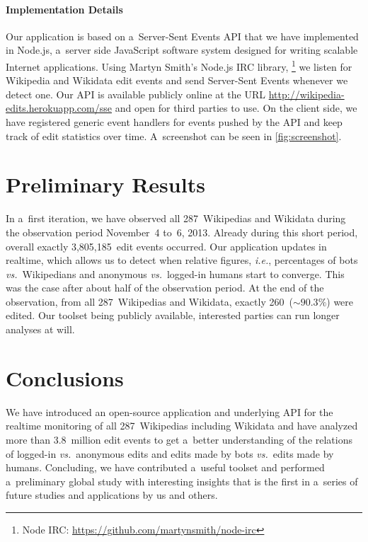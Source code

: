 \documentclass{sig-alternate}
\newcommand{\inlinelistingsize}{\fontsize{8pt}{11pt}}
\let\oldurl\url
\renewcommand{\url}[1]{\inlinelistingsize\oldurl{#1}}
\begin{document}
\paragraph{Implementation Details}

Our application is based on a~Server-Sent Events API
that we have implemented in Node.js,
a~server side JavaScript software system
designed for writing scalable Internet applications.
Using Martyn Smith's Node.js IRC library,%
\footnote{Node IRC:
\url{https://github.com/martynsmith/node-irc}}
we listen for Wikipedia and Wikidata edit events
and send Server-Sent Events whenever we detect one.
Our API is available publicly online
at the URL \url{http://wikipedia-edits.herokuapp.com/sse}
and open for third parties to use.
On the client side, we have registered generic event handlers for events
pushed by the API and keep track of edit statistics over time.
A~screenshot can be seen in \autoref{fig:screenshot}.

\section{Preliminary Results}

In a~first iteration, we have observed all 287~Wikipedias and Wikidata
during the observation period November~4
to~6, 2013.
Already during this short period,
overall exactly 3,805,185~edit events occurred.
Our application updates in realtime,
which allows us to detect when relative figures,
\emph{i.e.}, percentages of bots \emph{vs.}\ Wikipedians
and anonymous \emph{vs.}\ logged-in humans start to converge.
This was the case after about half of the observation period.
At the end of the observation,
from all 287~Wikipedias and Wikidata,
exactly 260~($\sim90.3\%$) were edited.
Our toolset being publicly available,
interested parties can run longer analyses at will.

\section{Conclusions}

We have introduced an open-source application
and underlying API for the realtime monitoring
of all 287~Wiki\-pedias including Wikidata
and have analyzed more than 3.8~million edit events
to get a~better understanding
of the relations of logged-in \emph{vs.}\ anonymous edits
and edits made by bots \emph{vs.}\ edits made by humans.
Concluding, we have contributed a~useful toolset
and performed a~preliminary global study 
with interesting insights that
is the first in a~series
of future studies and applications by us and others.



\balancecolumns
\end{document}
